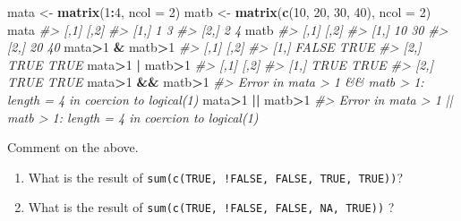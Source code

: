 \documentclass[
]{book}
\newenvironment{Shaded}{\begin{snugshade}}{\end{snugshade}}
\newcommand{\AttributeTok}[1]{\textcolor[rgb]{0.13,0.29,0.53}{#1}}
\newcommand{\CommentTok}[1]{\textcolor[rgb]{0.56,0.35,0.01}{\textit{#1}}}
\newcommand{\DecValTok}[1]{\textcolor[rgb]{0.00,0.00,0.81}{#1}}
\newcommand{\FunctionTok}[1]{\textcolor[rgb]{0.13,0.29,0.53}{\textbf{#1}}}
\newcommand{\NormalTok}[1]{#1}
\newcommand{\OtherTok}[1]{\textcolor[rgb]{0.56,0.35,0.01}{#1}}
\newcommand{\SpecialCharTok}[1]{\textcolor[rgb]{0.81,0.36,0.00}{\textbf{#1}}}
\providecommand{\tightlist}{%
  \setlength{\itemsep}{0pt}\setlength{\parskip}{0pt}}
\begin{document}
\begin{Shaded}
\begin{Highlighting}[]
\NormalTok{mata }\OtherTok{\textless{}{-}} \FunctionTok{matrix}\NormalTok{(}\DecValTok{1}\SpecialCharTok{:}\DecValTok{4}\NormalTok{, }\AttributeTok{ncol =} \DecValTok{2}\NormalTok{)}
\NormalTok{matb }\OtherTok{\textless{}{-}} \FunctionTok{matrix}\NormalTok{(}\FunctionTok{c}\NormalTok{(}\DecValTok{10}\NormalTok{, }\DecValTok{20}\NormalTok{, }\DecValTok{30}\NormalTok{, }\DecValTok{40}\NormalTok{), }\AttributeTok{ncol =} \DecValTok{2}\NormalTok{)}
\NormalTok{mata}
\CommentTok{\#\textgreater{}      [,1] [,2]}
\CommentTok{\#\textgreater{} [1,]    1    3}
\CommentTok{\#\textgreater{} [2,]    2    4}
\NormalTok{matb}
\CommentTok{\#\textgreater{}      [,1] [,2]}
\CommentTok{\#\textgreater{} [1,]   10   30}
\CommentTok{\#\textgreater{} [2,]   20   40}
\NormalTok{mata}\SpecialCharTok{\textgreater{}}\DecValTok{1} \SpecialCharTok{\&}\NormalTok{ matb}\SpecialCharTok{\textgreater{}}\DecValTok{1}
\CommentTok{\#\textgreater{}       [,1] [,2]}
\CommentTok{\#\textgreater{} [1,] FALSE TRUE}
\CommentTok{\#\textgreater{} [2,]  TRUE TRUE}
\NormalTok{mata}\SpecialCharTok{\textgreater{}}\DecValTok{1} \SpecialCharTok{|}\NormalTok{ matb}\SpecialCharTok{\textgreater{}}\DecValTok{1}
\CommentTok{\#\textgreater{}      [,1] [,2]}
\CommentTok{\#\textgreater{} [1,] TRUE TRUE}
\CommentTok{\#\textgreater{} [2,] TRUE TRUE}
\NormalTok{mata}\SpecialCharTok{\textgreater{}}\DecValTok{1} \SpecialCharTok{\&\&}\NormalTok{ matb}\SpecialCharTok{\textgreater{}}\DecValTok{1}
\CommentTok{\#\textgreater{} Error in mata \textgreater{} 1 \&\& matb \textgreater{} 1: \textquotesingle{}length = 4\textquotesingle{} in coercion to \textquotesingle{}logical(1)\textquotesingle{}}
\NormalTok{mata}\SpecialCharTok{\textgreater{}}\DecValTok{1} \SpecialCharTok{||}\NormalTok{ matb}\SpecialCharTok{\textgreater{}}\DecValTok{1}
\CommentTok{\#\textgreater{} Error in mata \textgreater{} 1 || matb \textgreater{} 1: \textquotesingle{}length = 4\textquotesingle{} in coercion to \textquotesingle{}logical(1)\textquotesingle{}}
\end{Highlighting}
\end{Shaded}

Comment on the above.

\begin{enumerate}
\def\labelenumi{(\alph{enumi})}
\setcounter{enumi}{4}
\tightlist
\item
  What is the result of \texttt{sum(c(TRUE,\ !FALSE,\ FALSE,\ TRUE,\ TRUE))}?
\item
  What is the result of \texttt{sum(c(TRUE,\ !FALSE,\ FALSE,\ NA,\ TRUE))} ?
\end{enumerate}
\end{document}
